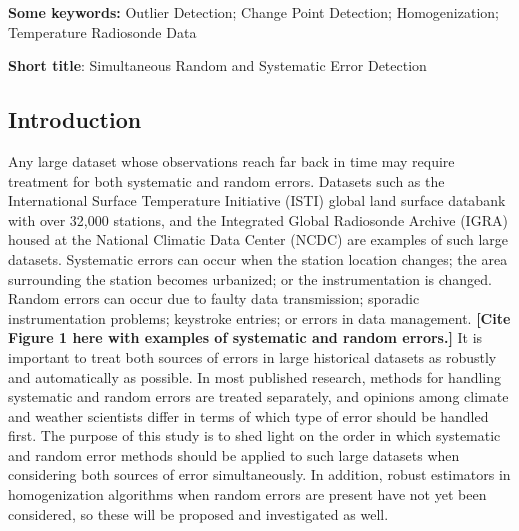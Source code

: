 \documentclass[12pt]{article}
\begin{document}


\begin{singlespacing}
\par\vfill\noindent
{\bf Some keywords:} Outlier Detection; Change Point Detection; Homogenization; Temperature Radiosonde Data

\par\medskip\noindent
{\bf Short title}:  Simultaneous Random and Systematic Error Detection

\end{singlespacing}
\clearpage\pagebreak\newpage {}
\begin{doublespacing}


\section{Introduction}

Any large dataset whose observations reach far back in time may require treatment for both systematic and random errors. Datasets such as the International Surface Temperature Initiative (ISTI) global land surface databank \cite{rennie14} with over 32,000 stations, and the Integrated Global Radiosonde Archive (IGRA) housed at the National Climatic Data Center (NCDC) \cite{durre06} are examples of such large datasets. Systematic errors can occur when the station location changes; the area surrounding the station becomes urbanized; or the instrumentation is changed. Random errors can occur due to faulty data transmission; sporadic instrumentation problems; keystroke entries; or errors in data management. \textbf{[Cite Figure 1 here with examples of systematic and random errors.]} It is important to treat both sources of errors in  large historical datasets as robustly and automatically as possible. In most published research, methods for handling systematic and random errors are treated separately, and opinions among climate and weather scientists differ in terms of which type of error should be handled first. The purpose of this study is to shed light on the order in which systematic and random error methods should be applied to such large datasets when considering both sources of error simultaneously. In addition, robust estimators in homogenization algorithms when random errors are present have not yet been considered, so these will be proposed and investigated as well.


\end{doublespacing}
\end{document}
